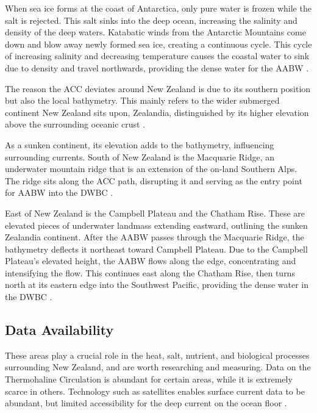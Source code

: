 \documentclass[12pt,a4paper]{article}
\begin{document}
When sea ice forms at the coast of Antarctica, only pure water is frozen while
the salt is rejected. This salt sinks into the deep ocean, increasing the
salinity and density of the deep waters. Katabatic winds from the Antarctic
Mountains come down and blow away newly formed sea ice, creating a continuous
cycle. This cycle of increasing salinity and decreasing temperature causes the
coastal water to sink due to density and travel northwards, providing the
dense water for the AABW \citep{silvano2023}.

The reason the ACC deviates around New Zealand is due to its southern
position but also the local bathymetry. This mainly refers to the wider
submerged continent New Zealand sits upon, Zealandia, distinguished by its
higher elevation above the surrounding oceanic crust \citep{mortimer2017}.

As a sunken continent, its elevation adds to the bathymetry, influencing
surrounding currents. South of New Zealand is the Macquarie Ridge, an
underwater mountain ridge that is an extension of the on-land Southern Alps.
The ridge sits along the ACC path, disrupting it and serving as the entry
point for AABW into the DWBC \citep{niwa2008}.

East of New Zealand is the Campbell Plateau and the Chatham Rise. These are
elevated pieces of underwater landmass extending eastward, outlining the
sunken Zealandia continent. After the AABW passes through the Macquarie
Ridge, the bathymetry deflects it northeast toward Campbell Plateau. Due to
the Campbell Plateau's elevated height, the AABW flows along the edge,
concentrating and intensifying the flow. This continues east along the Chatham
Rise, then turns north at its eastern edge into the Southwest Pacific,
providing the dense water in the DWBC \citep{carter1997}.

\newpage %

\subsection{Data Availability}

These areas play a crucial role in the heat, salt, nutrient, and biological
processes surrounding New Zealand, and are worth researching and measuring.
Data on the Thermohaline Circulation is abundant for certain areas, while it
is extremely scarce in others. Technology such as satellites enables surface
current data to be abundant, but limited accessibility for the deep current
on the ocean floor \citep{carter1997}.
\end{document}

